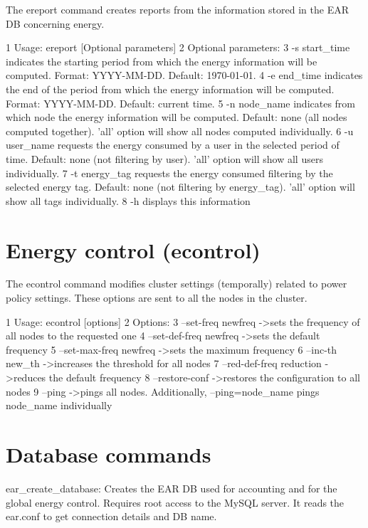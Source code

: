 The ereport command creates reports from the information stored in the E\+AR DB concerning energy. 
\begin{DoxyCode}
1 Usage: ereport [Optional parameters]
2     Optional parameters:
3         -s  start\_time  indicates the starting period from which the energy information will be computed.
       Format: YYYY-MM-DD. Default: 1970-01-01.
4         -e  end\_time    indicates the end of the period from which the energy information will be computed.
       Format: YYYY-MM-DD. Default: current time.
5         -n  node\_name   indicates from which node the energy information will be computed. Default: none
       (all nodes computed together). 'all' option will show all nodes computed individually.
6         -u  user\_name   requests the energy consumed by a user in the selected period of time. Default:
       none (not filtering by user). 'all' option will show all users individually.
7         -t  energy\_tag  requests the energy consumed filtering by the selected energy tag. Default: none
       (not filtering by energy\_tag). 'all' option will show all tags individually.
8         -h              displays this information
\end{DoxyCode}
 \section*{Energy control (econtrol)}

The econtrol command modifies cluster settings (temporally) related to power policy settings. These options are sent to all the nodes in the cluster.


\begin{DoxyCode}
1 Usage: econtrol [options]
2     Options:
3         --set-freq  newfreq         ->sets the frequency of all nodes to the requested one
4         --set-def-freq  newfreq     ->sets the default frequency
5         --set-max-freq  newfreq     ->sets the maximum frequency
6         --inc-th  new\_th            ->increases the threshold for all nodes
7         --red-def-freq  reduction   ->reduces the default frequency
8         --restore-conf              ->restores the configuration to all nodes
9         --ping                      ->pings all nodes. Additionally, --ping=node\_name pings node\_name
       individually
\end{DoxyCode}


\section*{Database commands}


\begin{DoxyItemize}
\item ear\+\_\+create\+\_\+database\+: Creates the E\+AR DB used for accounting and for the global energy control. Requires root access to the My\+S\+QL server. It reads the ear.\+conf to get connection details and DB name. 
\end{DoxyItemize}